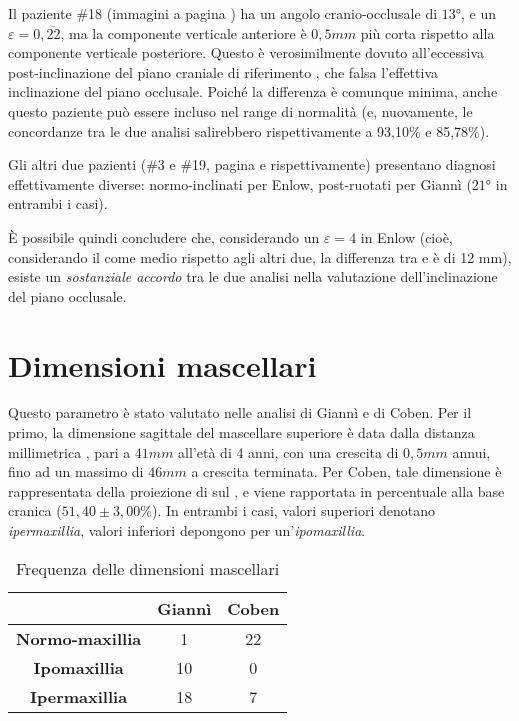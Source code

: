 Il paziente \#18 (immagini a pagina \pageref{paz:TILO1999}) ha un angolo cranio-occlusale di $13°$, e un $\varepsilon = 0,\overline{22}$, ma la componente verticale anteriore è $0,5 mm$ più corta rispetto alla componente verticale posteriore. Questo è verosimilmente dovuto all'eccessiva post-inclinazione del piano craniale di riferimento , che falsa l'effettiva inclinazione del piano occlusale. Poiché la differenza è comunque minima, anche questo paziente può essere incluso nel range di normalità (e, nuovamente, le concordanze tra le due analisi salirebbero rispettivamente a 93,10\% e 85,78\%).

Gli altri due pazienti (\#3 e \#19, pagina \pageref{paz:MASCHI2000} e \pageref{paz:ELITRI1998} rispettivamente) presentano diagnosi effettivamente diverse: normo-inclinati per Enlow, post-ruotati per Giannì ($21°$ in entrambi i casi).

È possibile quindi concludere che, considerando un $\varepsilon = 4$ in Enlow (cioè, considerando il  come medio rispetto agli altri due, la differenza tra  e  è di 12 mm), esiste un \emph{sostanziale accordo} tra le due analisi nella valutazione dell'inclinazione del piano occlusale.

\section{Dimensioni mascellari}
Questo parametro è stato valutato nelle analisi di Giannì e di Coben. Per il primo, la dimensione sagittale del mascellare superiore è data dalla distanza millimetrica , pari a $41 mm$ all'età di 4 anni, con una crescita di $0,5 mm$ annui, fino ad un massimo di $46 mm$ a crescita terminata. Per Coben, tale dimensione è rappresentata della proiezione di  sul , e viene rapportata in percentuale alla base cranica  ($51,40 \pm 3,00\%$). In entrambi i casi, valori superiori denotano \emph{ipermaxillia}, valori inferiori depongono per un'\emph{ipomaxillia}.

\begin{table}[!h]
\centering
\caption{Frequenza delle dimensioni mascellari}
\label{tab:dimensioni_mascellari_frequenze}
\begin{tabular}{>{\bfseries}ccc}
\toprule
& \textbf{Giannì} & \textbf{Coben} \\
\midrule
Normo-maxillia & 1 & 22 \\
Ipomaxillia & 10 & 0 \\
Ipermaxillia & 18 & 7 \\
\bottomrule
\end{tabular}
\end{table}

